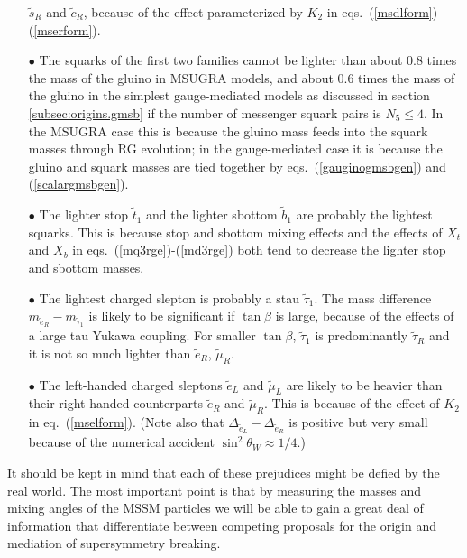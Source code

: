 \documentclass[12pt]{article}
\def\stilde{\widetilde}
\def\nmess{N_5}
\begin{document}
\begin{itemize}
$\stilde s_R$ and $\stilde c_R$, because of the effect parameterized
by $K_2$ in eqs.~(\ref{msdlform})-(\ref{mserform}).
%
\item[$\bullet$] The squarks of the first two families cannot be lighter 
than about 0.8 times the mass of the gluino in MSUGRA 
models, and about 0.6 times the mass of the gluino in the simplest 
gauge-mediated models as discussed in section \ref{subsec:origins.gmsb} if 
the number of messenger squark pairs is $\nmess \leq 4$.
In the MSUGRA case this is because the gluino mass feeds
into the squark masses through RG evolution; in the gauge-mediated case it
is because the gluino and squark masses are tied together by
eqs.~(\ref{gauginogmsbgen}) and (\ref{scalargmsbgen}). 
%
\item[$\bullet$] The lighter stop $\stilde t_1$ and the lighter sbottom 
$\stilde b_1$ are probably the lightest squarks. This is because stop and 
sbottom mixing effects and the effects of $X_t$ and $X_b$ in 
eqs.~(\ref{mq3rge})-(\ref{md3rge}) both tend to decrease the lighter stop 
and sbottom masses.
%
\item[$\bullet$] The lightest charged slepton is probably a stau $\stilde 
\tau_1$. The mass difference $m_{\tilde e_R}-m_{\tilde \tau_1}$ is 
likely to be significant if $\tan\beta$ is large, because of the effects 
of a large tau Yukawa coupling. For smaller $\tan\beta$, $\stilde \tau_1$ 
is predominantly $\stilde \tau_R$ and it is not so much lighter than 
$\stilde e_R$, $\stilde \mu_R$.
%
\item[$\bullet$] The left-handed charged sleptons $\stilde e_L$ and 
$\stilde \mu_L$ are likely to be heavier than their right-handed 
counterparts $\stilde e_R$ and $\stilde \mu_R$. This is because of the 
effect of $K_2$ in eq.~(\ref{mselform}). (Note also that $\Delta_{\tilde 
e_L} - \Delta_{\tilde e_R}$ is positive but very small because of the 
numerical accident $\sin^2\theta_W \approx 1/4$.)
%
\end{itemize}
It should be kept in mind that each of these prejudices 
might be defied by the real world.
The most important point is that by measuring the masses and mixing angles 
of the MSSM particles we will be able to gain a great deal of information 
that differentiate between competing proposals for the 
origin and mediation of supersymmetry breaking.

\end{document}
